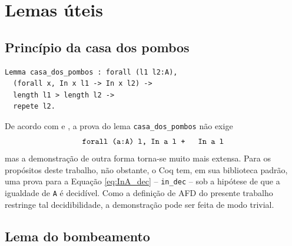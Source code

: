 \section{Lemas úteis}

\subsection{Princípio da casa dos pombos}


\begin{verbatim}
Lemma casa_dos_pombos : forall (l1 l2:A),
  (forall x, In x l1 -> In x l2) ->
  length l1 > length l2 ->
  repete l2.
\end{verbatim}

De acordo com  e , a prova do lema \texttt{casa_dos_pombos} não exige \begin{equation}\label{eq:InA_dec}\text{\texttt{forall (a:A) l, {In a l} + {~ In a l}}}\end{equation} mas a demonstração de outra forma torna-se muito mais extensa. Para os propósitos deste trabalho, não obstante, o Coq tem, em sua biblioteca padrão, uma prova para a Equação \ref{eq:InA_dec} -- \texttt{in_dec} -- sob a hipótese de que a igualdade de \texttt{A} é decidível. Como a definição de AFD do presente trabalho restringe tal decidibilidade, a demonstração pode ser feita de modo trivial.

\subsection{Lema do bombeamento}
